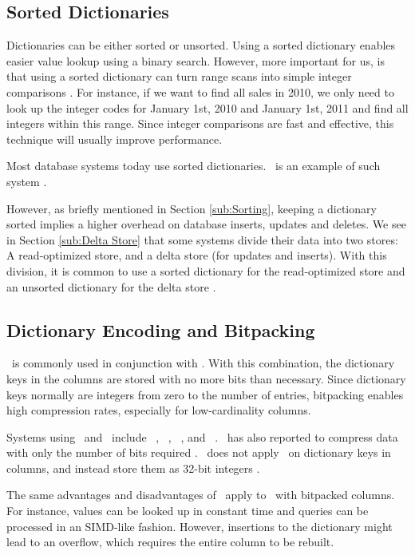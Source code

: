 \subsection{Sorted Dictionaries}
\label{sub:Sorted Dictionaries}
Dictionaries can be either sorted or unsorted. Using a sorted dictionary enables easier value lookup using a binary search. However, more important for us, is that using a sorted dictionary can turn range scans into simple integer comparisons \cite{Faust2015-ke}. For instance, if we want to find all sales in 2010, we only need to look up the integer codes for January 1st, 2010 and January 1st, 2011 and find all integers within this range. Since integer comparisons are fast and effective, this technique will usually improve performance. 

Most database systems today use sorted dictionaries. \saph~is an example of such system \cite{Farber2012-vh}.

However, as briefly mentioned in Section \ref{sub:Sorting}, keeping a dictionary sorted implies a higher overhead on database inserts, updates and deletes. We see in Section \ref{sub:Delta Store} that some systems divide their data into two stores: A read-optimized store, and a delta store (for updates and inserts). With this division, it is common to use a sorted dictionary for the read-optimized store and an unsorted dictionary for the delta store \cite{Plattner2014-fr}.

\subsection{Dictionary Encoding and Bitpacking}
\label{sub:Dictionary Encoding and Bitpacking}
\de~is commonly used in conjunction with \bp. With this combination, the dictionary keys in the columns are stored with no more bits than necessary. Since dictionary keys normally are integers from zero to the number of entries, bitpacking enables high compression rates, especially for low-cardinality columns.

Systems using \de~and \bp~include \ibm~\cite{Raman2013-em}, \blink~\cite{Barber2012-xt}, \sapnw~\cite{Willhalm2009-hu}, and \saph~\cite{Psaroudakis2014-ma}. \qlikview~has also reported to compress data with only the number of bits required \cite{Qlik2014-vd}. \mssql~does not apply \bp~on dictionary keys in columns, and instead store them as 32-bit integers \cite{Larson2013-mc}.

The same advantages and disadvantages of \bp~apply to \de~with bitpacked columns. For instance, values can be looked up in constant time and queries can be processed in an SIMD-like fashion. However, insertions to the dictionary might lead to an overflow, which requires the entire column to be rebuilt.


